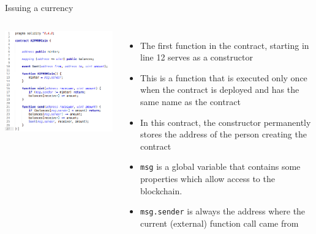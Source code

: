\documentclass[9pt]{beamer}
\begin{document}
\begin{frame}{Issuing a currency}
	\begin{columns}
	    \includegraphics  [scale=0.3]{Images/contract5}

	    \begin{itemize}
			\item The first function in the contract, starting in line 12 serves as a constructor
			\item This is a function that is executed only once when the contract is deployed and has the same name as the contract
			\item In this contract, the constructor permanently stores the address of the person creating the contract
			\item \texttt{msg} is a global variable that contains some properties which allow access to the blockchain.
			\item \texttt{msg.sender} is always the address where the current (external) function call came from
	    \end{itemize}
	\end{columns}
\end{frame}

\end{document}

